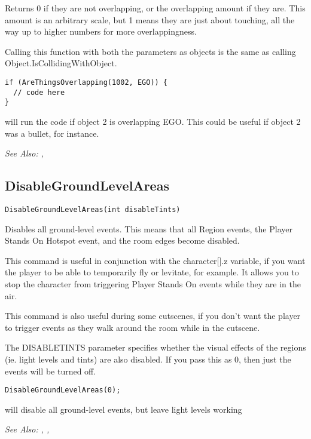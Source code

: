 Returns 0 if they are not overlapping, or the overlapping amount if they are. This amount
is an arbitrary scale, but 1 means they are just about touching, all the way up to higher numbers
for more overlappingness.

Calling this function with both the parameters as objects is the same as calling Object.IsCollidingWithObject.

\begin{verbatim}
if (AreThingsOverlapping(1002, EGO)) {
  // code here
}
\end{verbatim}
will run the code if object 2 is overlapping EGO. This could be useful if object 2 was a bullet,
for instance.

\it{See Also:} ,



\subsection{DisableGroundLevelAreas}\label{DisableGroundLevelAreas}%

\begin{verbatim}
DisableGroundLevelAreas(int disableTints)
\end{verbatim}
Disables all ground-level events. This means that all Region events, the Player Stands
On Hotspot event, and the room edges become disabled.

This command is useful in conjunction with the character[].z variable, if you want the player
to be able to temporarily fly or levitate, for example. It allows you to stop the character
from triggering Player Stands On events while they are in the air.

This command is also useful during some cutscenes, if you don't want the player to trigger
events as they walk around the room while in the cutscene.

The DISABLETINTS parameter specifies whether the visual effects of the regions (ie. light
levels and tints) are also disabled. If you pass this as 0, then just the events will
be turned off.

\begin{verbatim}
DisableGroundLevelAreas(0);
\end{verbatim}
will disable all ground-level events, but leave light levels working

\it{See Also:} , ,


